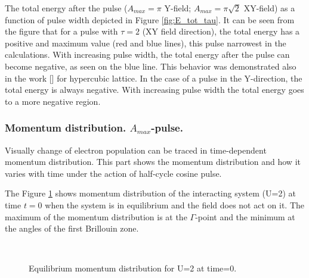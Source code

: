 The total energy after the pulse ($A_{max} = \pi$ Y-field; $A_{max} =\pi\sqrt{2}$ XY-field) as a function of pulse width depicted in Figure \ref{fig:E_tot_tau}. It can be seen from the figure that for a pulse with $\tau = 2$ (XY field direction), the total energy has a positive and maximum value (red and blue lines), this pulse narrowest in the calculations. With increasing pulse width, the total energy after the pulse can become negative, as seen on the blue line. This behavior was demonstrated also in the work [\citet{PhysRevB.85.155124}] for hypercubic lattice.
In the case of a pulse in the Y-direction, the total energy is always negative. With increasing pulse width the total energy goes to a more negative region.

\subsubsection{Momentum distribution. $A_{max}$-pulse.}

Visually change of electron population can be traced in time-dependent momentum distribution. This part shows the momentum distribution and how it varies with time under the action of half-cycle cosine pulse.

The Figure \ref{fig:md_u2_t0} shows momentum distribution of the interacting system (U=2) at time $t = 0$ when the system is in equilibrium and the field does not act on it. The maximum of the momentum distribution is at the $\Gamma$-point and the minimum at the angles of the first Brillouin zone.

\begin{figure}[h!]
 \\
\caption{Equilibrium momentum distribution for U=2 at time=0.}
\label{fig:md_u2_t0}
\end{figure}

